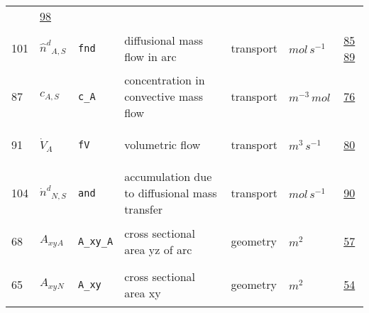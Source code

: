 \begin{longtable}{|p{1cm}|p{2.5cm}|p{4.5cm}|p{8cm}|p{3.0cm}|p{3cm}|p{1cm}|}
             &                 \hyperlink{"e:98"}{ 98 }
                 \\
            101
             & \hypertarget{"v:101"}{ $ {{\hat{n}^d}}{_{A, S}} $}
             & \verb|fnd|
             & diffusional mass flow in arc
             & \begin{lay}transport \end{lay}
             & $ mol \,s^{-1} \, $
             &                 \hyperlink{"e:85"}{ 85 }
                                 \hyperlink{"e:89"}{ 89 }
                 \\
            87
             & \hypertarget{"v:87"}{ $ {c}{_{A, S}} $}
             & \verb|c_A|
             & concentration in convective mass flow
             & \begin{lay}transport \end{lay}
             & $ m^{-3} \,mol \, $
             &                 \hyperlink{"e:76"}{ 76 }
                 \\
            91
             & \hypertarget{"v:91"}{ $ {{\dot{V}}}{_{A}} $}
             & \verb|fV|
             & volumetric flow
             & \begin{lay}transport \end{lay}
             & $ m^{3} \,s^{-1} \, $
             &                 \hyperlink{"e:80"}{ 80 }
                 \\
            104
             & \hypertarget{"v:104"}{ $ {{\dot{n}^d}}{_{N, S}} $}
             & \verb|and|
             & accumulation due to diffusional mass transfer
             & \begin{lay}transport \end{lay}
             & $ mol \,s^{-1} \, $
             &                 \hyperlink{"e:90"}{ 90 }
                 \\
            68
             & \hypertarget{"v:68"}{ $ {{A_{xy}}}{_{A}} $}
             & \verb|A_xy_A|
             & cross sectional area yz of arc
             & \begin{lay}geometry \end{lay}
             & $ m^{2} \, $
             &                 \hyperlink{"e:57"}{ 57 }
                 \\
            65
             & \hypertarget{"v:65"}{ $ {{A_{xy}}}{_{N}} $}
             & \verb|A_xy|
             & cross sectional area xy
             & \begin{lay}geometry \end{lay}
             & $ m^{2} \, $
             &                 \hyperlink{"e:54"}{ 54 }

\end{longtable}

